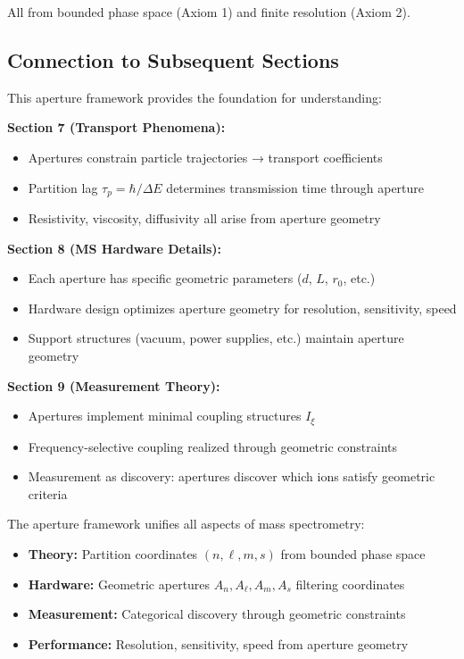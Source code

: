 All from bounded phase space (Axiom 1) and finite resolution (Axiom 2).

\subsection{Connection to Subsequent Sections}

This aperture framework provides the foundation for understanding:

\textbf{Section 7 (Transport Phenomena):}
\begin{itemize}
    \item Apertures constrain particle trajectories → transport coefficients
    \item Partition lag $\tau_p = \hbar/\Delta E$ determines transmission time through aperture
    \item Resistivity, viscosity, diffusivity all arise from aperture geometry
\end{itemize}

\textbf{Section 8 (MS Hardware Details):}
\begin{itemize}
    \item Each aperture has specific geometric parameters ($d$, $L$, $r_0$, etc.)
    \item Hardware design optimizes aperture geometry for resolution, sensitivity, speed
    \item Support structures (vacuum, power supplies, etc.) maintain aperture geometry
\end{itemize}

\textbf{Section 9 (Measurement Theory):}
\begin{itemize}
    \item Apertures implement minimal coupling structures $I_\xi$
    \item Frequency-selective coupling realized through geometric constraints
    \item Measurement as discovery: apertures discover which ions satisfy geometric criteria
\end{itemize}

The aperture framework unifies all aspects of mass spectrometry:
\begin{itemize}
    \item \textbf{Theory:} Partition coordinates $(n,\ell,m,s)$ from bounded phase space
    \item \textbf{Hardware:} Geometric apertures $A_n, A_\ell, A_m, A_s$ filtering coordinates
    \item \textbf{Measurement:} Categorical discovery through geometric constraints
    \item \textbf{Performance:} Resolution, sensitivity, speed from aperture geometry
\end{itemize}

